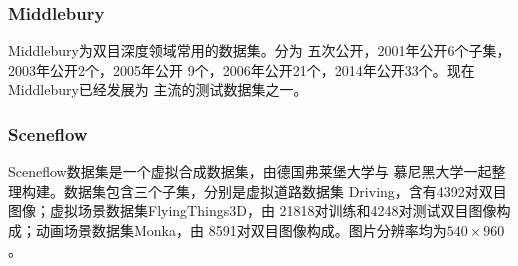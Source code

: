 \subsubsection{Middlebury}
Middlebury\cite{middlebury}为双目深度领域常用的数据集。分为
五次公开，2001年公开6个子集，2003年公开2个，2005年公开
9个，2006年公开21个，2014年公开33个。现在Middlebury已经发展为
主流的测试数据集之一。
\subsubsection{Sceneflow}
Sceneflow数据集是一个虚拟合成数据集，由德国弗莱堡大学与
慕尼黑大学一起整理构建。数据集包含三个子集，分别是虚拟道路数据集
Driving，含有4392对双目图像；虚拟场景数据集FlyingThings3D，由
21818对训练和4248对测试双目图像构成；动画场景数据集Monka，由
8591对双目图像构成。图片分辨率均为$540 \times 960$。
